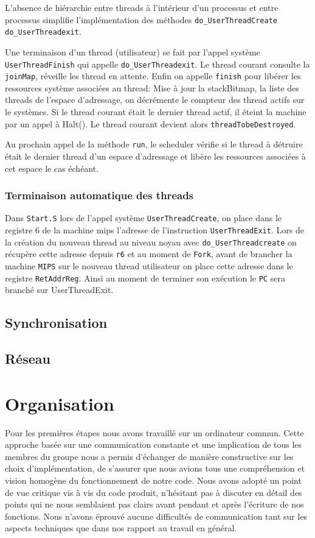 \documentclass[11pt]{article}
\begin{document}
L'absence de hiérarchie entre threads à l'intérieur d'un processus et entre processus simplifie
l'implémentation des méthodes \texttt{do\_UserThreadCreate} \texttt{do\_UserThreadexit}.

Une terminaison d'un thread (utilisateur) se fait par l'appel système \texttt{UserThreadFinish} qui appelle \texttt{do\_UserThreadexit}. Le thread courant consulte la \texttt{joinMap}, réveille les thread en attente. Enfin on appelle \texttt{finish} pour libérer les ressources système associées au thread:
Mise à jour la stackBitmap, la liste des threads de l'espace d'adressage, on décrémente le compteur des
thread actifs sur le systèmes. Si le thread courant était le dernier thread actif, il éteint la machine par un appel à Halt(). Le thread courant devient alors \texttt{threadTobeDestroyed}.

Au prochain appel de la méthode \texttt{run}, le scheduler vérifie si le thread à détruire était le dernier
thread d'un espace d'adressage et libère les ressources associées à cet espace le cas échéant.

\subsubsection{Terminaison automatique des threads}
Dans \texttt{Start.S} lors de l'appel système \texttt{UserThreadCreate}, on place dans le registre 6 de la machine mips l'adresse de l'instruction \texttt{UserThreadExit}.
Lors de la création du nouveau thread au niveau noyau avec \texttt{do\_UserThreadcreate} on récupère
cette adresse depuis \texttt{r6} et au moment de \texttt{Fork}, avant de brancher la machine \texttt{MIPS} sur
le nouveau thread utilisateur on place cette adresse dans le registre \texttt{RetAddrReg}. Ainsi au moment de terminer son exécution le \texttt{PC} sera branché sur UserThreadExit.

\subsection{Synchronisation}

\subsection{Réseau}


\section{Organisation}
Pour les premières étapes nous avons travaillé sur un ordinateur commun.
Cette approche basée sur une communication constante et une implication de tous les membres du groupe
nous a permis d'échanger de manière constructive sur les choix d'implémentation, de s'assurer que
nous avions tous une compréhension et vision homogène du fonctionnement de notre code. Nous
avons adopté un point de vue critique vis à vis du code produit,
n'hésitant pas à discuter en détail des points qui ne nous semblaient pas clairs
avant pendant et après l'écriture de nos fonctions. Nous n'avons éprouvé aucune difficultés de communication
tant sur les aspects techniques que dans nos rapport au travail en général.
\end{document}
